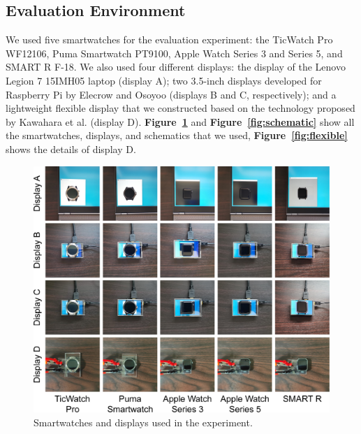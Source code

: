 \documentclass{ieeeaccess}
\newcommand\figref[1]{\textbf{Figure~\ref{fig:#1}}}
\begin{document}
\subsection{Evaluation Environment}
We used five smartwatches for the evaluation experiment: the TicWatch Pro WF12106, Puma Smartwatch PT9100, Apple Watch Series 3 and Series 5, and SMART R F-18. We also used four different displays: the display of the Lenovo Legion 7 15IMH05 laptop (display A); two 3.5-inch displays developed for Raspberry Pi by Elecrow and Osoyoo (displays B and C, respectively); and a lightweight flexible display that we constructed based on the technology proposed by Kawahara et al. \cite{flexible_display} (display D). \figref{smartwatches} and \figref{schematic} show all the smartwatches, displays, and schematics that we used, \figref{flexible} shows the details of display D.

\begin{figure}[!t]
  \centering
  \includegraphics[width=1\linewidth]{figures/smartwatches.eps}
  \caption{Smartwatches and displays used in the experiment.}
  \label{fig:smartwatches}
\end{figure}
\end{document}
